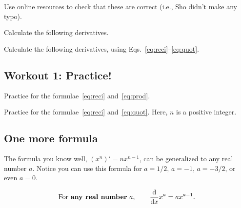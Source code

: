 \documentclass[11pt,pdfa,lastpage]{MishoNote}
\begin{document}
\begin{problems}
  \Problem[S]
  Use online resources to check that these are correct (i.e., Sho didn't make any typo).
\end{problems}
\begin{problems}
  \Problem[S] Calculate the following derivatives.
  \begin{menumerate}{3}
  \end{menumerate}
  \Problem[S] Calculate the following derivatives, using Eqs.~\eqref{eq:reci}--\eqref{eq:quot}.
  \begin{menumerate}{3}
  \end{menumerate}
\end{problems}

\subsection{Workout 1: Practice!}
\begin{problems}
\Problem[S] Practice for the formulae~\eqref{eq:reci} and~\eqref{eq:prod}.
\begin{menumerate}{3}
\end{menumerate}
\Problem[S] Practice for the formulae~\eqref{eq:reci} and~\eqref{eq:quot}. Here, $n$ is a positive integer.
\begin{menumerate}{4}
\end{menumerate}
\end{problems}
\subsection{One more formula}
The formula you know well, $(x^n)'=nx^{n-1}$, can be generalized to any real number $a$.
Notice you can use this formula for $a=1/2$, $a=-1$, $a=-3/2$, or even $a=0$.
\begin{theorem}{}{}
  \begin{equation}
  \text{For \Emph{any real number}}~a,\qquad \diff{}{x}x^a = ax^{a-1}.
  \end{equation}
\end{theorem}
\end{document}
